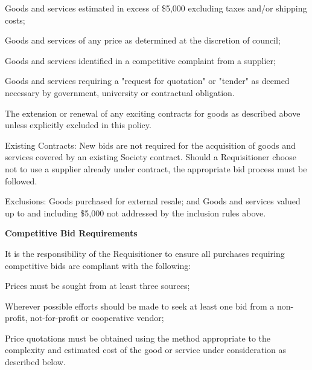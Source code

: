\begin{longenum}[label*=\thesection.\arabic*., align=left]
\begin{longenum} [label*=\arabic*., align=left]
	\item Goods and services estimated in excess of \$5,000 excluding taxes and/or shipping costs;
	\item Goods and services of any price as determined at the discretion of council; 
	\item Goods and services identified in a competitive complaint from a supplier;
	\item Goods and services requiring a "request for quotation" or "tender" as deemed necessary by government, university or contractual obligation.
	\item The extension or renewal of any exciting contracts for goods as described above unless explicitly excluded in this policy.
	
	\item Existing Contracts: \newline
	New bids are not required for the acquisition of goods and services covered by an existing Society contract. Should a Requisitioner choose not to use a supplier already under contract, the appropriate bid process must be followed.
	
	\item Exclusions: \newline
	Goods purchased for external resale; and
	Goods and services valued up to and including \$5,000 not addressed by the inclusion rules above.

\end{longenum}

\item \textbf{Competitive Bid Requirements}
\begin{longenum} [label*=\arabic*., align=left]
	\item It is the responsibility of the Requisitioner to ensure all purchases requiring competitive bids are compliant with the following:
		\begin{longenum} [label*=\arabic*., align=left]
	\item Prices must be sought from at least three sources;
	\item Wherever possible efforts should be made to seek at least one bid from a non-profit, not-for-profit or cooperative vendor;
	\item Price quotations must be obtained using the method appropriate to the complexity and estimated cost of the good or service under consideration as described below.
\end{longenum}	
\end{longenum}


\end{longenum}
